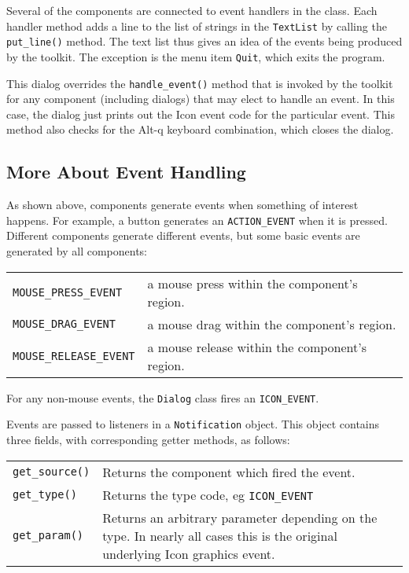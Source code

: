Several of the components are connected to event handlers in the class.
Each handler method adds a line to the list of strings in the
\texttt{TextList} by calling the \texttt{put\_line()} method. The text
list thus gives an idea of the events being produced by the toolkit.
The exception is the menu item \texttt{Quit}, which exits the
program.

This dialog overrides the \texttt{handle\_event()} method that is
invoked by the toolkit for any component (including dialogs)
that may elect to handle an event. In this case, the dialog just
prints out the Icon event code for the particular event. This method
also checks for the Alt-q keyboard combination, which closes the
dialog.

\subsection*{More About Event Handling}

As shown above, components generate events when
something of interest happens. For example, a button generates an
\texttt{ACTION\_EVENT} when it is pressed. Different components
generate different events, but some basic events are generated by
all components:

\vspace{0.15in}
\begin{xtabular}{m{2.2in} m{3.5in}}
\texttt{MOUSE\_PRESS\_EVENT} &
 a mouse press within the component's
region.\\
\texttt{MOUSE\_DRAG\_EVENT} &
 a mouse drag within the component's
region.\\
\texttt{MOUSE\_RELEASE\_EVENT} &
 a mouse release within the component's
region.\\
\end{xtabular}
\vspace{0.15in}

\noindent For any non-mouse events, the \texttt{Dialog} class fires an
\texttt{ICON\_EVENT}.

Events are passed to listeners in a \texttt{Notification}
object. This object contains three fields,
with corresponding getter methods, as follows:

\vspace{0.15in}
\begin{xtabular}{m{1.2in} m{4.7in}}
\texttt{get\_source()} & Returns the component which fired the event.\\
\texttt{get\_type()} & Returns the type code, eg \texttt{ICON\_EVENT}\\
\texttt{get\_param()} &
Returns an arbitrary parameter depending on the type. In
nearly all cases this is the original underlying Icon graphics event.\\
\end{xtabular}
\vspace{0.15in}

